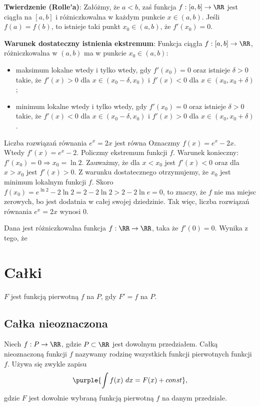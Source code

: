\textbf{Twierdzenie (Rolle’a)}:
Załóżmy, że $a<b$, zaś funkcja $f:[a,b]\to\RR$ jest ciągła na $[a,b]$ i różniczkowalna w każdym punkcie $x\in(a,b)$. Jeśli $f(a)=f(b)$, to istnieje taki punkt $x_0\in(a,b)$, że $f'(x_0)=0$.

\textbf{Warunek dostateczny istnienia ekstremum}:
Funkcja ciągła $f:[a,b]\to\RR$, różniczkowalna w $(a,b)$ ma w punkcie $x_0\in(a,b)$:
\begin{itemize}
    \item maksimum lokalne wtedy i tylko wtedy, gdy $f'(x_0)=0$ oraz istnieje $\delta>0$ takie, że $f'(x)>0$ dla $x\in(x_0-\delta, x_0)$ i $f'(x)<0$ dla $x\in(x_0, x_0+\delta)$;
    \item minimum lokalne wtedy i tylko wtedy, gdy $f'(x_0)=0$ oraz istnieje $\delta>0$ takie, że $f'(x)<0$ dla $x\in(x_0-\delta, x_0)$ i $f'(x)>0$ dla $x\in(x_0, x_0+\delta)$.
\end{itemize}

\begin{exam}
    Liczba rozwiązań równania $e^x = 2x$ jest równa
    Oznaczmy $f(x)=e^x-2x$. Wtedy $f'(x)=e^x-2$. Policzmy ekstremum funkcji $f$. Warunek konieczny: $f'(x_0)=0 \Rightarrow x_0=\ln{2}$. Zauważmy, że dla $x<x_0$ jest $f'(x)<0$ oraz dla $x>x_0$ jest $f'(x)>0$. Z warunku dostatecznego otrzymujemy, że $x_0$ jest minimum lokalnym funkcji $f$. Skoro $f(x_0)=e^{\ln{2}}-2\ln{2}=2-2\ln{2}>2-2\ln{e}=0$, to znaczy, że $f$ nie ma miejsc zerowych, bo jest dodatnia w całej swojej dziedzinie. Tak więc, liczba rozwiązań równania $e^x=2x$ wynosi 0.
\end{exam}

\begin{problems}
    \prob Dana jest różniczkowalna funkcja $f: \RR \to \RR$, taka że $f'(0) = 0$. Wynika z tego, że
\end{problems}

\section{Całki}
$F$ jest funkcją pierwotną $f$ na $P$, gdy $F'=f$ na $P$.

\subsection{Całka nieoznaczona}
Niech $f:P\to\RR$, gdzie $P\subset\RR$ jest dowolnym przedziałem. Całką nieoznaczoną funkcji $f$ nazywamy rodzinę wszystkich funkcji pierwotnych funkcji $f$. Używa się zwykle zapisu
$$
\purple{\int f(x)\ dx = F(x) + const},
$$
gdzie $F$ jest dowolnie wybraną funkcją pierwotną $f$ na danym przedziale.

